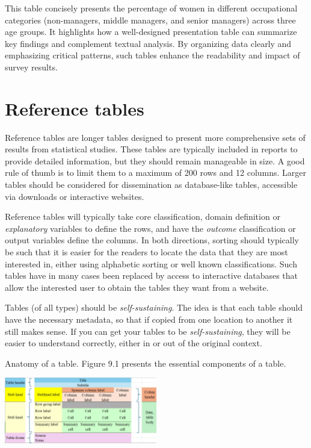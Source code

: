 \documentclass[
  12pt,
]{book}
\begin{document}
This table concisely presents the percentage of women in different occupational categories (non-managers, middle managers, and senior managers) across three age groups. It highlights how a well-designed presentation table can summarize key findings and complement textual analysis. By organizing data clearly and emphasizing critical patterns, such tables enhance the readability and impact of survey results.

\hypertarget{reference-tables}{%
\section{Reference tables}\label{reference-tables}}

Reference tables are longer tables designed to present more comprehensive sets of results from statistical studies. These tables are typically included in reports to provide detailed information, but they should remain manageable in size. A good rule of thumb is to limit them to a maximum of 200 rows and 12 columns. Larger tables should be considered for dissemination as database-like tables, accessible via downloads or interactive websites.

Reference tables will typically take core classification, domain definition or \emph{explanatory} variables to define the rows, and have the \emph{outcome} classification or output variables define the columns. In both directions, sorting should typically be such that it is easier for the readers to locate the data that they are most interested in, either using alphabetic sorting or well known classifications. Such tables have in many cases been replaced by access to interactive databases that allow the interested user to obtain the tables they want from a website.

Tables (of all types) should be \emph{self-sustaining}. The idea is that each table should have the necessary metadata, so that if copied from one location to another it still makes sense. If you can get your tables to be \emph{self-sustaining}, they will be easier to understand correctly, either in or out of the original context.

Anatomy of a table. Figure 9.1 presents the essential components of a table.

\includegraphics[width=0.5\textwidth,height=\textheight]{pics/Table1.jpg}
\end{document}
